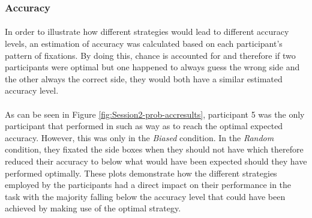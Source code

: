 \documentclass[12pt]{article}
\begin{document}


\subsubsection*{Accuracy}
\paragraph{} In order to illustrate how different strategies would lead to different accuracy levels, an estimation of accuracy was calculated based on each participant's pattern of fixations. By doing this, chance is accounted for and therefore if two participants were optimal but one happened to always guess the wrong side and the other always the correct side, they would both have a similar estimated accuracy level. 

\paragraph{} As can be seen in Figure \ref{fig:Session2-prob-accresults}, participant 5 was the only participant that performed in such as way as to reach the optimal expected accuracy. However, this was only in the \textit{Biased} condition. In the \textit{Random} condition, they fixated the side boxes when they should not have which therefore reduced their accuracy to below what would have been expected should they have performed optimally. These plots demonstrate how the different strategies employed by the participants had a direct impact on their performance in the task with the majority falling below the accuracy level that could have been achieved by making use of the optimal strategy. 

\end{document}
